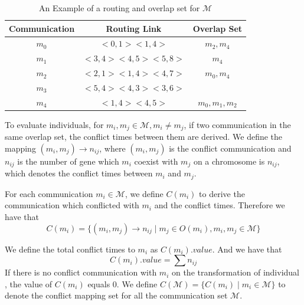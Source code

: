 \documentclass[journal]{IEEEtran}
\begin{document}
\begin{table}[!t]
	\renewcommand{\arraystretch}{1.3}
	\caption{An Example of a routing and overlap set for $\mathcal{M}$}
	\label{t:overlap}
	\centering
	\begin{tabular}{|c||c||c|}
		\hline
		\textbf{Communication} & \textbf{Routing Link}& \textbf{Overlap Set}\\
		\hline
		$m_{0}$ & $ <0,1><1,4>$ 		& $m_{2},m_{4}$ \\
		\hline
		$m_{1}$ & $ <3,4><4,5><5,8>$	& $m_{4}$ \\
		\hline
		$m_{2}$ & $ <2,1><1,4><4,7>$ 	& $m_{0},m_{4}$ \\
		\hline		
		$m_{3}$ & $ <5,4><4,3><3,6>$ 	& \\
		\hline
		$m_{4}$ & $ <1,4><4,5>$ 		& $m_{0},m_{1},m_{2}$ \\
		\hline		
	\end{tabular}
\end{table}

To evaluate individuals, for $m_{i},m_{j}\in \mathcal{M}, m_{i}\neq m_{j}$, if two communication in the same overlap set, the conflict times between them are derived. We define the mapping $(m_{i},m_{j})\rightarrow n_{ij}$, where $(m_{i},m_{j})$ is the conflict communication and $n_{ij}$ is the number of gene which $m_{i}$ coexist with $m_{j}$ on a chromosome is $n_{ij}$, which denotes the conflict times between $m_{i}$ and $m_{j}$.

For each communication $m_{i}\in\mathcal{M}$, we define $C(m_{i})$ to derive the communication which conflicted with $m_{i}$ and the conflict times. Therefore we have that
\begin{equation}
	C(m_{i}) = 
\{(m_{i},m_{j})\rightarrow n_{ij}\mid m_j\in O(m_{i}),m_{i},m_{j}\in \mathcal{M}\}
\end{equation}

We define the total conflict times to $m_{i}$ as $C(m_i).value$. And we have that
\begin{equation}
	C(m_i).value=\sum n_{ij}
\end{equation}
If there is no conflict communication with $m_i$ on the transformation of individual , the value of $C(m_i)$ equals 0. We define $C(\mathcal{M}) = \{ C(m_i)\mid m_i\in\mathcal{M} \} $ to denote the conflict mapping set for all the communication set $\mathcal{M}$.
\end{document}
